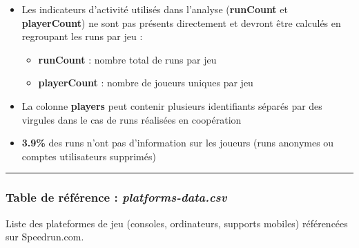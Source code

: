 \documentclass[
]{article}
\providecommand{\tightlist}{%
  \setlength{\itemsep}{0pt}\setlength{\parskip}{0pt}}
\begin{document}
\begin{itemize}
\tightlist
\item
  Les indicateurs d'activité utilisés dans l'analyse (\textbf{runCount}
  et \textbf{playerCount}) ne sont pas présents directement et devront
  être calculés en regroupant les runs par jeu :

  \begin{itemize}
  \tightlist
  \item
    \textbf{runCount} : nombre total de runs par jeu
  \item
    \textbf{playerCount} : nombre de joueurs uniques par jeu
  \end{itemize}
\item
  La colonne \textbf{players} peut contenir plusieurs identifiants
  séparés par des virgules dans le cas de runs réalisées en coopération
\item
  \textbf{3.9\%} des runs n'ont pas d'information sur les joueurs (runs
  anonymes ou comptes utilisateurs supprimés)
\end{itemize}

\begin{center}\rule{0.5\linewidth}{0.5pt}\end{center}

\subsubsection{\texorpdfstring{Table de référence :
\emph{platforms-data.csv}}{Table de référence : platforms-data.csv}}\label{table-de-ruxe9fuxe9rence-platforms-data.csv}

Liste des plateformes de jeu (consoles, ordinateurs, supports mobiles)
référencées sur Speedrun.com.
\end{document}

